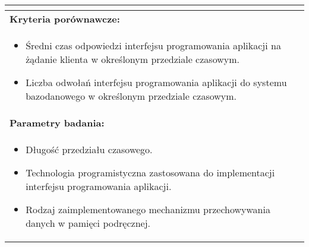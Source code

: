 \begin{longtable}[c]{|llll|}
{\begin{itemize}[label={}]
          \end{itemize}
    }                                                           \\ \hline
    \multicolumn{4}{|l|}{\textbf{Kryteria porównawcze:}}                             \\ \hline
    \multicolumn{4}{|p{\linewidth}|}{
        \begin{itemize}
            \item Średni czas odpowiedzi interfejsu programowania aplikacji na żądanie klienta w określonym przedziale czasowym.
            \item Liczba odwołań interfejsu programowania aplikacji do systemu bazodanowego w określonym przedziale czasowym.
        \end{itemize}
    }                                                           \\ \hline
    \multicolumn{4}{|l|}{\textbf{Parametry badania:}}                                \\ \hline
    \multicolumn{4}{|p{\linewidth}|}{
        \begin{itemize}
            \item Długość przedziału czasowego.
            \item Technologia programistyczna zastosowana do implementacji interfejsu programowania aplikacji.
            \item Rodzaj zaimplementowanego mechanizmu przechowywania danych w pamięci podręcznej.
        \end{itemize}
    }                                                           \\ \hline
\end{longtable}

